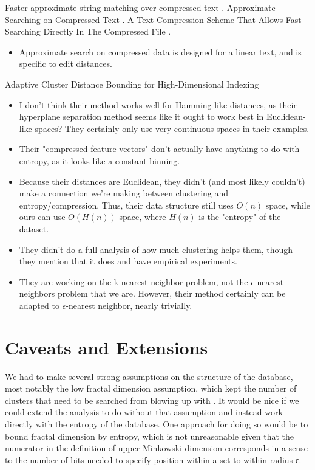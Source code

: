 \documentclass{amsbook}
\theoremstyle{definition}
\theoremstyle{remark}
\numberwithin{equation}{section}
\begin{document}
Faster approximate string matching over compressed text \cite{navarro2001faster}.
Approximate Searching on Compressed Text \cite{perez2005approximate}.
A Text Compression Scheme That Allows Fast Searching Directly In The Compressed File \cite{manber93atext}.
\begin{itemize}
\item Approximate search on compressed data is designed for a linear text, and is specific to edit distances.
\end{itemize}

Adaptive Cluster Distance Bounding for High-Dimensional Indexing \cite{ramaswamy2011adaptive}
\begin{itemize}
\item I don't think their method works well for Hamming-like distances, as
   their hyperplane separation method seems like it ought to work best
   in Euclidean-like spaces? They certainly only use very continuous
   spaces in their examples.
\item Their "compressed feature vectors" don't actually have anything to do
   with entropy, as it looks like a constant binning.
\item Because their distances are Euclidean, they didn't (and most likely
   couldn't) make a connection we're making between clustering and
   entropy/compression. Thus, their data structure still uses $O(n)$
   space, while ours can use $O(H(n))$ space, where $H(n)$ is the "entropy"
   of the dataset.
\item They didn't do a full analysis of how much clustering helps them,
   though they mention that it does and have empirical experiments.
\item They are working on the k-nearest neighbor problem, not the
   $\epsilon$-nearest neighbors problem that we are. However, their method
   certainly can be adapted to $\epsilon$-nearest neighbor, nearly
   trivially.
\end{itemize}


\section{Caveats and Extensions}

We had to make several strong assumptions on the structure of the database, most notably the low fractal dimension assumption, which kept the number of clusters that need to be searched from blowing up with .
It would be nice if we could extend the analysis to do without that assumption and instead work directly with the entropy of the database.
One approach for doing so would be to bound fractal dimension by entropy, which is not unreasonable given that the numerator in the definition of upper Minkowski dimension corresponds in a sense to the number of bits needed to specify position within a set to within radius ϵ.
\end{document}
